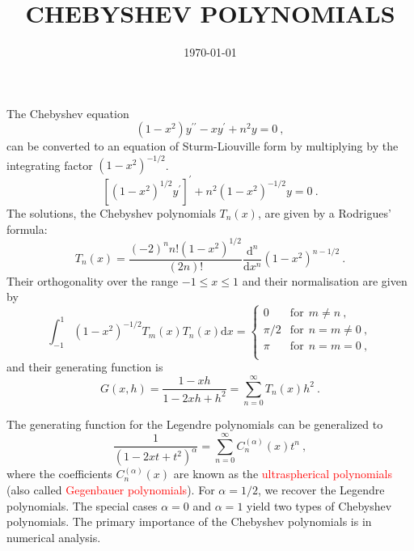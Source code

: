 \documentclass[12pt,a4paper]{article}
\title{CHEBYSHEV POLYNOMIALS}
\author{}
\date{\today}
\newcommand{\dif}{\mathrm{d}}
\begin{document}
\maketitle
\cite{riley2006mathematical}
The Chebyshev equation
\begin{equation}
(1-x^2) y^{\prime \prime} -xy^\prime +n^2 y = 0 ~,
\end{equation}
can be converted to an equation of Sturm-Liouville form by multiplying by the integrating factor $(1 - x^2)^{-1/2}$.
\begin{equation}
\left[(1-x^2)^{1/2} y^\prime \right]^\prime +n^2 (1 - x^2)^{-1/2} y = 0 ~.
\end{equation}
The solutions, the Chebyshev polynomials $T_n(x)$, are given by a Rodrigues' formula:
\begin{equation}
T_n(x) = \dfrac{(-2)^n n! (1-x^2)^{1/2}}{(2n)!} \dfrac{\dif^n }{\dif x^n} (1-x^2)^{n-1/2} ~.
\end{equation}
Their orthogonality over the range $-1 \leqslant x \leqslant 1$ and their normalisation are given by
\begin{equation}
\int_{-1}^1 (1-x^2)^{-1/2} T_m(x) T_n(x) \dif x = 
\left\{
\begin{array}{ll}
      0     & \text{for}~ ~m \neq n ~, \\
      \pi/2 & \text{for} ~~n = m \neq 0 ~, \\
      \pi    & \text{for} ~~n = m = 0 ~, \\
\end{array} 
\right.
\end{equation}
and their generating function is
\begin{equation}
G(x, h) = \dfrac{1-xh}{1 -2xh +h^2} = \sum_{n=0}^\infty T_n (x) h^2 ~.
\end{equation}



\cite{arfken} The generating function for the Legendre polynomials can be generalized to
\begin{equation}
\dfrac{1}{(1-2xt+t^2)^\alpha} = \sum_{n=0}^\infty C^{(\alpha)}_n (x) t^n ~,
\end{equation}
where the coefficients $C^{(\alpha)}_n(x)$ are known as the \textcolor{red}{ultraspherical polynomials} (also called \textcolor{red}{Gegenbauer polynomials}). For $\alpha = 1/2$, we recover the Legendre polynomials. The special cases $\alpha = 0$ and $\alpha = 1$ yield two types of Chebyshev polynomials. The primary importance of the Chebyshev polynomials is in numerical analysis.
\end{document}
